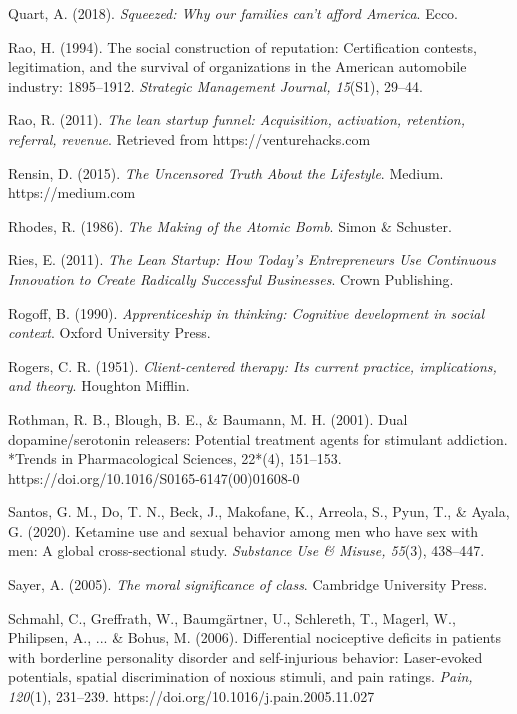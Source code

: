 \begin{thebibliography}{}

    Quart, A. (2018). \textit{Squeezed: Why our families can't afford America}. Ecco.


    Rao, H. (1994). The social construction of reputation: Certification contests, legitimation, and the survival of organizations in the American automobile industry: 1895–1912. \textit{Strategic Management Journal, 15}(S1), 29–44.

    Rao, R. (2011). \textit{The lean startup funnel: Acquisition, activation, retention, referral, revenue}. Retrieved from https://venturehacks.com

    Rensin, D. (2015). \textit{The Uncensored Truth About the Lifestyle}. Medium. https://medium.com

    Rhodes, R. (1986). \textit{The Making of the Atomic Bomb}. Simon \& Schuster.

    Ries, E. (2011). \textit{The Lean Startup: How Today’s Entrepreneurs Use Continuous Innovation to Create Radically Successful Businesses}. Crown Publishing.
    
    Rogoff, B. (1990). \textit{Apprenticeship in thinking: Cognitive development in social context}. Oxford University Press.

    Rogers, C. R. (1951). \textit{Client-centered therapy: Its current practice, implications, and theory}. Houghton Mifflin.

    Rothman, R. B., Blough, B. E., \& Baumann, M. H. (2001). Dual dopamine/serotonin releasers: Potential treatment agents for stimulant addiction. *Trends in Pharmacological Sciences, 22*(4), 151–153. https://doi.org/10.1016/S0165-6147(00)01608-0


    Santos, G. M., Do, T. N., Beck, J., Makofane, K., Arreola, S., Pyun, T., \& Ayala, G. (2020). Ketamine use and sexual behavior among men who have sex with men: A global cross-sectional study. \textit{Substance Use \& Misuse, 55}(3), 438–447.

    Sayer, A. (2005). \textit{The moral significance of class}. Cambridge University Press.

    Schmahl, C., Greffrath, W., Baumgärtner, U., Schlereth, T., Magerl, W., Philipsen, A., ... \& Bohus, M. (2006). Differential nociceptive deficits in patients with borderline personality disorder and self-injurious behavior: Laser-evoked potentials, spatial discrimination of noxious stimuli, and pain ratings. \textit{Pain, 120}(1), 231–239. https://doi.org/10.1016/j.pain.2005.11.027


\end{thebibliography}
